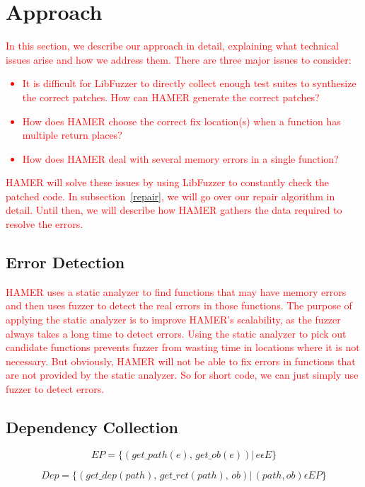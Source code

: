 \documentclass[a4j,dvipdfmx]{article}
\begin{document}
\section{Approach}
\textcolor{red}{
In this section, we describe our approach in detail, explaining what technical issues arise and how we address them. There are three major issues to consider:
\begin{itemize}
\item It is difficult for LibFuzzer to directly collect enough test suites to synthesize the correct patches. How can HAMER generate the correct patches?
\item How does HAMER choose the correct fix location(s) when a function has multiple return places?
\item How does HAMER deal with several memory errors in a single function?
\end{itemize}
}

\textcolor{red}{
HAMER will solve these issues by using LibFuzzer to constantly check the patched code. In subsection~\ref{repair}, we will go over our repair algorithm in detail. Until then, we will describe how HAMER gathers the data required to resolve the errors.
}
\subsection{Error Detection}
\textcolor{red}{
HAMER uses a static analyzer to find functions that may have memory errors and then uses fuzzer to detect the real errors in those functions. The purpose of applying the static analyzer is to improve HAMER's scalability, as the fuzzer always takes a long time to detect errors. Using the static analyzer to pick out candidate functions prevents fuzzer from wasting time in locations where it is not necessary. But obviously, HAMER will not be able to fix errors in functions that are not provided by the static analyzer. So for short code, we can just simply use fuzzer to detect errors.
}

\subsection{Dependency Collection}
\begin{equation}
EP=\{(get\_path(e),\,get\_ob(e))|\, e \epsilon E\}
\end{equation}

\begin{equation}
Dep=\{(get\_dep(path),\,get\_ret(path),\,ob)|\, (path,ob) \epsilon EP\}
\end{equation}
\end{document}
